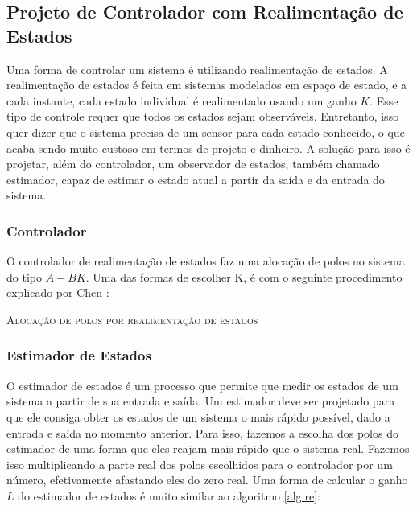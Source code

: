 \subsection{Projeto de Controlador com Realimentação de Estados}

Uma forma de controlar um sistema é utilizando realimentação de estados. A realimentação de estados é feita em sistemas modelados em espaço de estado, e a cada instante, cada estado individual é realimentado usando um ganho $K$. Esse tipo de controle requer que todos os estados sejam observáveis. Entretanto, isso quer dizer que o sistema precisa de um sensor para cada estado conhecido, o que acaba sendo muito custoso em termos de projeto e dinheiro. A solução para isso é projetar, além do controlador, um observador de estados, também chamado estimador, capaz de estimar o estado atual a partir da saída e da entrada do sistema.

\subsubsection{Controlador}

O controlador de realimentação de estados faz uma alocação de polos no sistema do tipo $A-BK$. Uma das formas de escolher K, é com o seguinte procedimento explicado por Chen \cite{chen1998}:

\IncMargin{1em}
\begin{algorithm}[H]
	
	\label{alg:re}
	\caption{\textsc{Alocação de polos por realimentação de estados}}
\end{algorithm}
\DecMargin{1em}

\subsubsection{Estimador de Estados}

O estimador de estados é um processo que permite que medir os estados de um sistema a partir de sua entrada e saída. Um estimador deve ser projetado para que ele consiga obter os estados de um sistema o mais rápido possível, dado a entrada e saída no momento anterior. Para isso, fazemos a escolha dos polos do estimador de uma forma que eles reajam mais rápido que o sistema real. Fazemos isso multiplicando a parte real dos polos escolhidos para o controlador por um número, efetivamente afastando eles do zero real. Uma forma de calcular o ganho $L$ do estimador de estados é muito similar ao algoritmo \ref{alg:re}:
\newline


